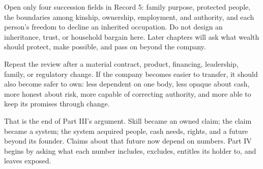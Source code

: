 Open only four succession fields in Record 5: family purpose, protected people,
the boundaries among kinship, ownership, employment, and authority, and each
person's freedom to decline an inherited occupation. Do not design an
inheritance, trust, or household bargain here. Later chapters will ask what
wealth should protect, make possible, and pass on beyond the company.

Repeat the review after a material contract, product, financing, leadership,
family, or regulatory change. If the company becomes easier to transfer, it
should also become safer to own: less dependent on one body, less opaque about
cash, more honest about risk, more capable of correcting authority, and more
able to keep its promises through change.

That is the end of Part III's argument. Skill became an owned claim; the claim
became a system; the system acquired people, cash needs, rights, and a future
beyond its founder. Claims about that future now depend on numbers. Part IV
begins by asking what each number includes, excludes, entitles its holder to,
and leaves exposed.
